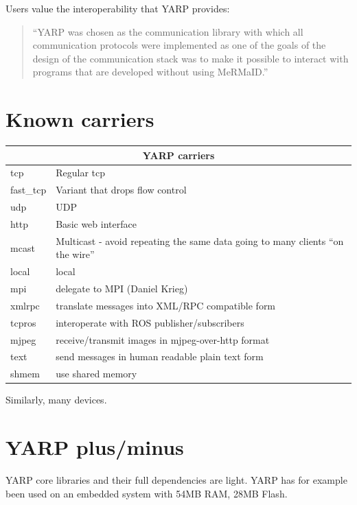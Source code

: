 \documentclass[letterpaper]{article}
\begin{document}
\noindent Users value the interoperability that YARP provides:

\begin{quote}
``YARP was chosen as the communication library with
which all communication protocols were implemented as
one of the goals of the design of the communication stack
was to make it possible to interact with programs that are
developed without using MeRMaID.'' \cite{barbosa09mermaid}
\end{quote}





\clearpage
\newpage




\section{Known carriers}

\begin{tabular}{|l|p{7cm}|}
\hline
\multicolumn{2}{|c|}{YARP carriers} \\
\hline
tcp & Regular tcp \\
fast\_tcp & Variant that drops flow control \\
udp & UDP \\
http & Basic web interface \\
mcast & Multicast - avoid repeating the same data going
to many clients ``on the wire''  \\
local & local \\
mpi & delegate to MPI (Daniel Krieg) \\
xmlrpc & translate messages into XML/RPC compatible form \\
tcpros & interoperate with ROS publisher/subscribers \\
mjpeg & receive/transmit images in mjpeg-over-http format \\
text & send messages in human readable plain text form \\
shmem & use shared memory \\
\hline
\end{tabular}

Similarly, many devices.


\section{YARP plus/minus}

YARP core libraries and their full dependencies are light.
YARP has for example been used on an embedded system
with 54MB RAM, 28MB Flash.
\end{document}
